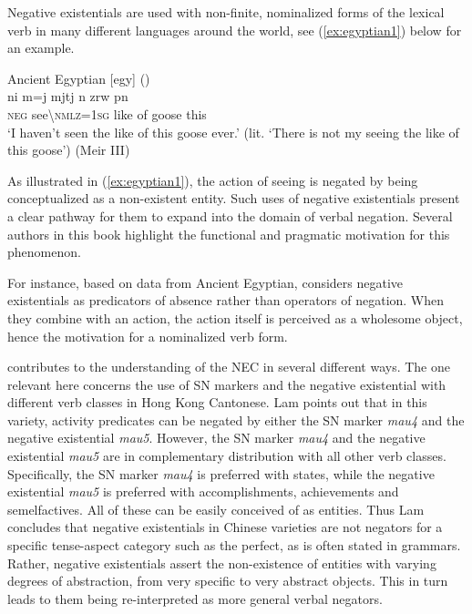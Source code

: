 \documentclass[output=paper,chinesefont,colorlinks,citecolor=brown]{langscibook}
\begin{document}
Negative existentials are used with non-finite, nominalized forms of the lexical verb in many different languages around the world, see (\ref{ex:egyptian1}) below for an example.

\begin{exe}
\ex Ancient Egyptian [egy] () \label{ex:egyptian1}\\
\gll ni m{\ꜣ}=j mjtj n zrw pn\\
	\textsc{neg} see\textbackslash\textsc{nmlz=1sg} like of goose this\\
	\glt ‘I haven’t seen the like of this goose ever.’ (lit. ‘There is not my seeing the like of this goose’) (Meir III)

\end{exe}
As illustrated in (\ref{ex:egyptian1}), the action of seeing is negated by being conceptualized as a non-existent entity. Such uses of negative existentials present a clear pathway for them to expand into the domain of verbal negation. Several authors in this book highlight the functional and pragmatic motivation for this phenomenon.

For instance,  based on data from Ancient Egyptian, considers negative existentials as predicators of absence rather than operators of negation. When they combine with an action, the action itself is perceived as a wholesome object, hence the motivation for a nominalized verb form.

 contributes to the understanding of the NEC in several different ways. The one relevant here concerns the use of SN markers and the negative existential with different verb classes in Hong Kong Cantonese. Lam points out that in this variety, activity predicates can be negated by either the SN marker \textit{mau4} and the negative existential \textit{mau5}. However, the SN marker \textit{mau4} and the negative existential \textit{mau5} are in complementary distribution with all other verb classes. Specifically, the SN marker \textit{mau4} is preferred with states, while the negative existential \textit{mau5} is preferred with accomplishments, achievements and semelfactives. All of these can be easily conceived of as entities. Thus Lam concludes that negative existentials in Chinese varieties are not negators for a specific tense-aspect category such as the perfect, as is often stated in grammars. Rather, negative existentials assert the non-existence of entities with varying degrees of abstraction, from very specific to very abstract objects. This in turn leads to them being re-interpreted as more general verbal negators.
\end{document}
